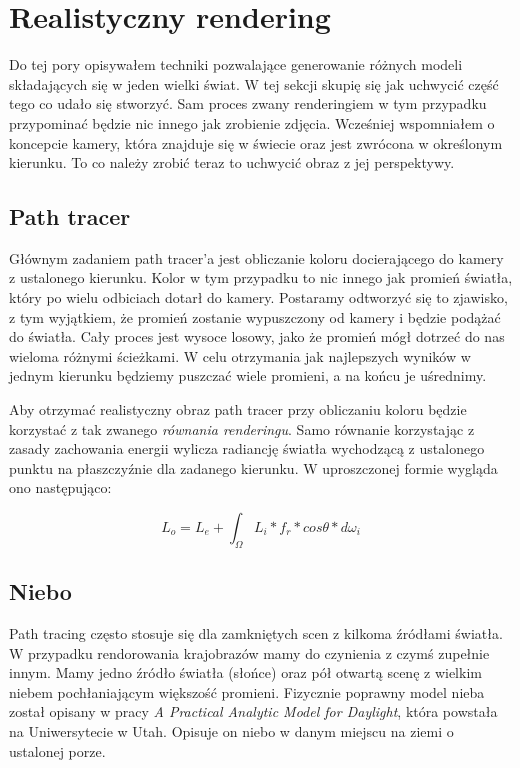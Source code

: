 \documentclass[inz,longabstract]{iithesis}
\begin{document}
    \section{Realistyczny rendering}
        Do tej pory opisywałem techniki pozwalające generowanie różnych modeli składających się w jeden wielki świat. W tej sekcji skupię się jak uchwycić część tego co udało się stworzyć. Sam proces zwany renderingiem w tym przypadku przypominać będzie nic innego jak zrobienie zdjęcia. Wcześniej wspomniałem o koncepcie kamery, która znajduje się w świecie oraz jest zwrócona w określonym kierunku. To co należy zrobić teraz to uchwycić obraz z jej perspektywy. 
        
        \subsection{Path tracer}
            Głównym zadaniem path tracer'a jest obliczanie koloru docierającego do kamery z ustalonego kierunku. Kolor w tym przypadku to nic innego jak promień światła, który po wielu odbiciach dotarł do kamery. Postaramy odtworzyć się to zjawisko, z tym wyjątkiem, że promień zostanie wypuszczony od kamery i będzie podążać do światła. Cały proces jest wysoce losowy, jako że promień mógł dotrzeć do nas wieloma różnymi ścieżkami. W celu otrzymania jak najlepszych wyników w jednym kierunku będziemy puszczać wiele promieni, a na końcu je uśrednimy.
            
            Aby otrzymać realistyczny obraz path tracer przy obliczaniu koloru będzie korzystać z tak zwanego \textit{równania renderingu}. Samo równanie korzystając z zasady zachowania energii wylicza radiancję światła wychodzącą z ustalonego punktu na płaszczyźnie dla zadanego kierunku. W uproszczonej formie wygląda ono następująco:
            
            \begin{equation}
            L_o = L_e + \int_{\Omega} L_i*f_r*cos\theta*d\omega_i
            \end{equation}

            
        \subsection{Niebo}
            Path tracing często stosuje się dla zamkniętych scen z kilkoma źródłami światła. W przypadku rendorowania krajobrazów mamy do czynienia z czymś zupełnie innym. Mamy jedno źródło światła (słońce) oraz pół otwartą scenę z wielkim niebem pochłaniającym większość promieni. Fizycznie poprawny model nieba został opisany w pracy \textit{A Practical Analytic Model for Daylight}\cite{sky}, która powstała na Uniwersytecie w Utah. Opisuje on niebo w danym miejscu na ziemi o ustalonej porze. 
            
\end{document}
